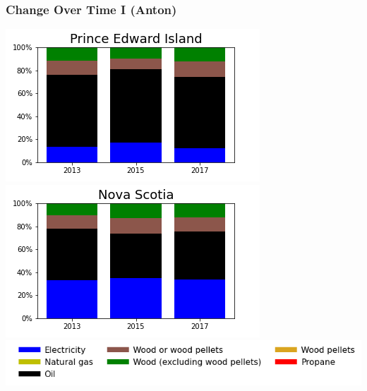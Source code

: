 \documentclass{beamer}
\begin{document}
\begin{frame}
\frametitle{Change Over Time I (Anton)}
\includegraphics[width=0.5\linewidth]{pe.png}%
\includegraphics[width=0.5\linewidth]{ns.png}\\
\includegraphics[width=\linewidth]{leg_bar.png}
\end{frame}
\end{document}
